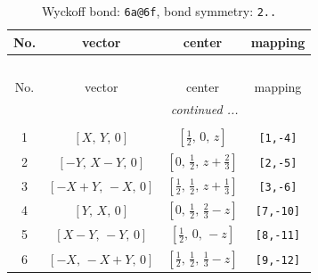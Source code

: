 \documentclass[fleqn,8pt]{jsarticle}
\begin{document}
\renewcommand{\arraystretch}{1.2}
\begin{longtable}{cccc}
\caption{Wyckoff bond: {\tt 6a@6f}, bond symmetry: {\tt 2..}}
 \\
 \hline \hline
No. & vector & center & mapping \\ \hline \endfirsthead

\multicolumn{3}{l}{\tablename\ \thetable{}} \\
 \hline \hline
No. & vector & center & mapping \\ \hline \endhead

 \hline \hline
\multicolumn{3}{r}{\footnotesize\it continued ...} \\ \endfoot

 \hline \hline
\multicolumn{3}{r}{} \\ \endlastfoot

1 & $\left[ X,\, Y,\, 0 \right]$ & $\left[ \frac{1}{2},\, 0,\, z \right]$ & {\tt [1,-4]} \\ \hline
2 & $\left[ - Y,\, X - Y,\, 0 \right]$ & $\left[ 0,\, \frac{1}{2},\, z + \frac{2}{3} \right]$ & {\tt [2,-5]} \\ \hline
3 & $\left[ - X + Y,\, - X,\, 0 \right]$ & $\left[ \frac{1}{2},\, \frac{1}{2},\, z + \frac{1}{3} \right]$ & {\tt [3,-6]} \\ \hline
4 & $\left[ Y,\, X,\, 0 \right]$ & $\left[ 0,\, \frac{1}{2},\, \frac{2}{3} - z \right]$ & {\tt [7,-10]} \\ \hline
5 & $\left[ X - Y,\, - Y,\, 0 \right]$ & $\left[ \frac{1}{2},\, 0,\, - z \right]$ & {\tt [8,-11]} \\ \hline
6 & $\left[ - X,\, - X + Y,\, 0 \right]$ & $\left[ \frac{1}{2},\, \frac{1}{2},\, \frac{1}{3} - z \right]$ & {\tt [9,-12]} \\
\end{longtable}
\renewcommand{\arraystretch}{1.2}
\end{document}
